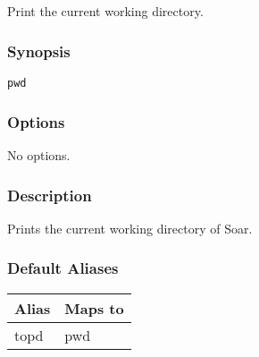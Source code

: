 \subsection{}
\label{pwd}
Print the current working directory. 
\subsubsection*{Synopsis}
\begin{verbatim}
pwd
\end{verbatim}
\subsubsection*{Options}
 No options. 
\subsubsection*{Description}
 Prints the current working directory of Soar. 
\subsubsection*{Default Aliases}
\begin{tabular}{|l|l|}
\hline 
 Alias  & Maps to  \\
 \hline 
 topd  & pwd  \\
 \hline 
\end{tabular}
